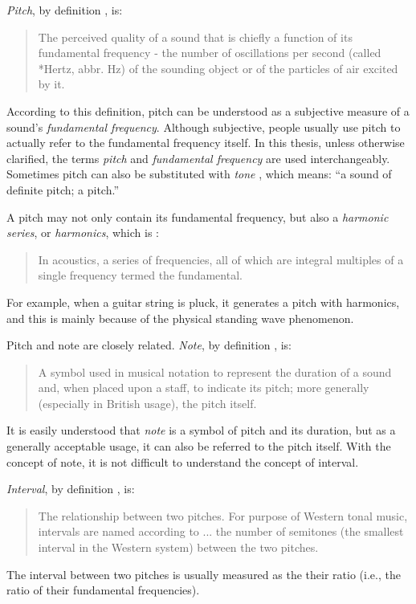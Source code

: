 {\it Pitch}, by definition \cite{randel1999harvard}, is:
\begin{quote}
The perceived quality of a sound that is chiefly a function of its fundamental frequency - the number of oscillations per second (called *Hertz, abbr. Hz) of the sounding object or of the particles of air excited by it.
\end{quote}
According to this definition, pitch can be understood as a subjective measure of a sound's \textit{fundamental frequency}. Although subjective, people usually use pitch to actually refer to the fundamental frequency itself. In this thesis, unless otherwise clarified, the terms {\it pitch} and {\it fundamental frequency} are used interchangeably. Sometimes pitch can also be substituted with {\it tone} \cite{randel1999harvard}, which means: ``a sound of definite pitch; a pitch.''

A pitch may not only contain its fundamental frequency, but also a {\it harmonic series}, or {\it harmonics}, which is \cite{randel1999harvard}:
\begin{quote}
In acoustics, a series of frequencies, all of which are integral multiples of a single frequency termed the fundamental.
\end{quote}
For example, when a guitar string is pluck, it generates a pitch with harmonics, and this is mainly because of the physical standing wave \cite{helmholtz2009sensations} phenomenon.

Pitch and note are closely related. {\it Note}, by definition \cite{randel1999harvard}, is:
\begin{quote}
A symbol used in musical notation to represent the duration of a sound and, when placed upon a staff, to indicate its pitch; more generally (especially in British usage), the pitch itself.
\end{quote}
It is easily understood that {\it note} is a symbol of pitch and its duration, but as a generally acceptable usage, it can also be referred to the pitch itself. With the concept of note, it is not difficult to understand the concept of interval.

{\it Interval}, by definition \cite{randel1999harvard}, is:
\begin{quote}
The relationship between two pitches. For purpose of Western tonal music, intervals are named according to ... the number of semitones (the smallest interval in the Western system) between the two pitches.
\end{quote}
The interval between two pitches is usually measured as the their ratio (i.e., the ratio of their fundamental frequencies).

